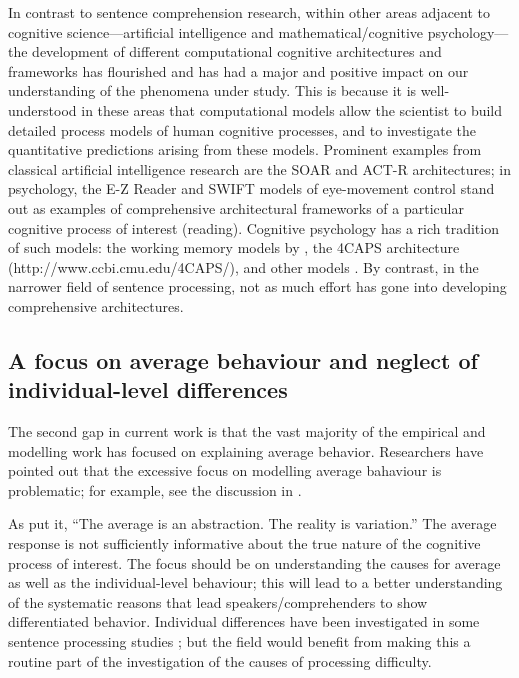 \documentclass{cambridge7A}\usepackage[]{graphicx}\usepackage[]{color}
\begin{document}
In contrast to sentence comprehension research, within other areas 
adjacent to cognitive science---artificial intelligence and 
mathematical/cognitive psychology---the development of different
computational cognitive architectures and frameworks has flourished
and has had a major and positive impact on our understanding of the
phenomena under study.  This is because it is well-understood in these
areas that computational models allow the scientist to build detailed
process models of human cognitive processes, and to investigate the
quantitative predictions arising from these models. Prominent examples
from classical artificial intelligence  research are the SOAR \citep{laird2012soar} and  
ACT-R \citep{AndersonEtAl2004} architectures; in psychology, the E-Z 
Reader \citep{Reichle2003,ReichleWarrenMcConnell2009} 
and SWIFT \citep{EngbertNuthmannRichter2005,richteretal06,Rabe2019} 
models of eye-movement control stand out as examples of 
comprehensive architectural frameworks of a particular cognitive
process of interest (reading).  Cognitive psychology has a rich 
tradition of such models: the working memory models by
\cite{OberauerKliegl2006,LewandowskyGeigerOberauer2008}, the  4CAPS architecture \citep{justetal99} (http://www.ccbi.cmu.edu/4CAPS/), and other models \citep{lee2014bayesian,busemeyer2010cognitive,lewiscogmodsym,farrell2018computational}.
By contrast, in the narrower field of sentence processing, not as much effort has gone into developing comprehensive architectures.

\subsection{A focus on average behaviour and neglect of individual-level differences}

The second gap in current work is that the vast majority of the empirical and modelling work has focused on explaining average behavior.  Researchers have pointed out that the excessive focus on modelling average bahaviour is problematic; for example, see the discussion in \cite{kidd2018individual}.

As \cite{norm} put it, ``The average is an abstraction. The reality is
variation.'' The average response is not sufficiently informative
about the true nature of the cognitive process of interest. The focus
should be on understanding the causes for average as well as the 
individual-level behaviour; this will lead to a better understanding
of the systematic reasons that lead speakers/comprehenders to show
differentiated behavior.  Individual differences have been
investigated in some sentence processing studies
\citep[e.g.,][]{JustCarpenter1992,van2014low,MacDonaldChristiansen2002}; but the
field would benefit from making this a routine part of the
investigation of the causes of processing difficulty.
\end{document}
